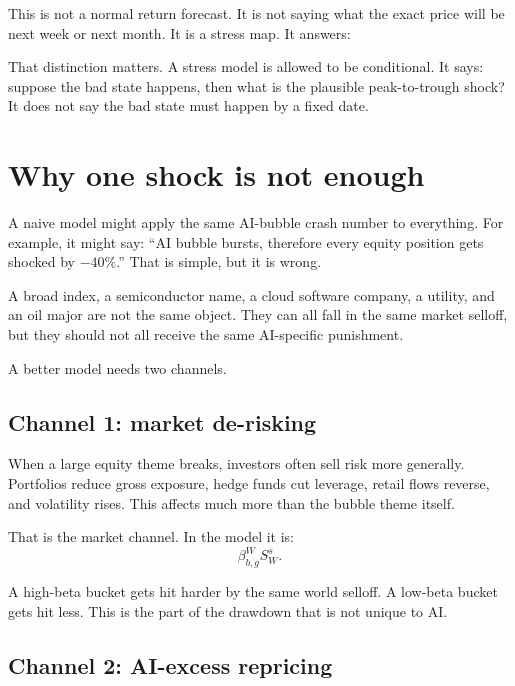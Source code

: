 \documentclass[10pt]{article}
\begin{document}
This is not a normal return forecast. It is not saying what the exact price will be next week or next month. It is a stress map. It answers:

\begin{center}
\end{center}

That distinction matters. A stress model is allowed to be conditional. It says: suppose the bad state happens, then what is the plausible peak-to-trough shock? It does not say the bad state must happen by a fixed date.

\section{Why one shock is not enough}

A naive model might apply the same AI-bubble crash number to everything. For example, it might say: ``AI bubble bursts, therefore every equity position gets shocked by $-40\%$.'' That is simple, but it is wrong.

A broad index, a semiconductor name, a cloud software company, a utility, and an oil major are not the same object. They can all fall in the same market selloff, but they should not all receive the same AI-specific punishment.

A better model needs two channels.

\subsection{Channel 1: market de-risking}

When a large equity theme breaks, investors often sell risk more generally. Portfolios reduce gross exposure, hedge funds cut leverage, retail flows reverse, and volatility rises. This affects much more than the bubble theme itself.

That is the market channel. In the model it is:
\[
\beta_{b,g}^{W}S_W^s.
\]

A high-beta bucket gets hit harder by the same world selloff. A low-beta bucket gets hit less. This is the part of the drawdown that is not unique to AI.

\subsection{Channel 2: AI-excess repricing}
\end{document}
